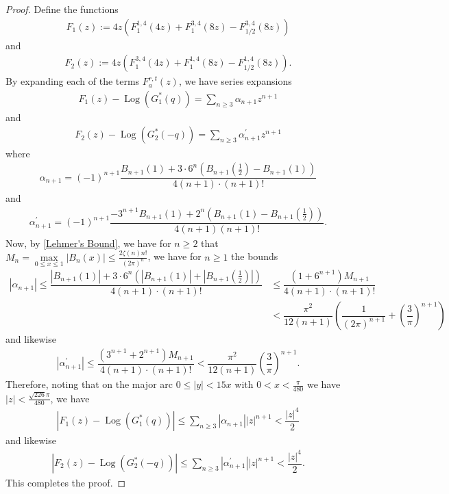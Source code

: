 \documentclass[11pt,reqno]{amsart}
\theoremstyle{definition}
\theoremstyle{plain}
\theoremstyle{named}
\DeclareMathOperator\Log{Log}
\numberwithin{equation}{section}
\theoremstyle{example}
\def\lp{\left(}
\def\rp{\right)}
\begin{document}
\begin{proof}
Define the functions
\begin{align*}
    F_1(z) := 4z \lp F_1^{1,4}(4z) + F_1^{3,4}(8z) - F_{1/2}^{3,4}(8z) \rp
\end{align*}
and
\begin{align*}
    F_2(z) := 4z\lp F_1^{3,4}(4z) + F_1^{1,4}(8z) - F_{1/2}^{1,4}(8z) \rp.
\end{align*}
By expanding each of the terms $F_a^{r,t}(z)$, we have series expansions
\begin{align*}
    F_1(z) - \Log\lp G_1^*(q) \rp = \sum_{n \geq 3} \alpha_{n+1} z^{n+1}
\end{align*}
and
\begin{align*}
    F_2(z) - \Log\lp G_2^*(-q) \rp = \sum_{n \geq 3} \alpha^\prime_{n+1} z^{n+1}
\end{align*}
where
\begin{align*}
    \alpha_{n+1} = (-1)^{n+1} \dfrac{B_{n+1}(1) + 3 \cdot 6^n \lp B_{n+1}\lp \frac 12 \rp - B_{n+1}(1) \rp}{4 (n+1) \cdot (n+1)!}
\end{align*}
and
\begin{align*}
    \alpha_{n+1}^\prime = \lp -1 \rp^{n+1} \dfrac{- 3^{n+1} B_{n+1}(1) + 2^n\lp B_{n+1}(1) - B_{n+1}\lp \frac 12 \rp \rp}{4 (n+1) (n+1)!}.
\end{align*}
Now, by \eqref{Lehmer's Bound}, we have for $n \geq 2$ that $M_n = \max\limits_{0 \leq x \leq 1} \left| B_n(x) \right| \leq \frac{2 \zeta(n) n!}{\lp 2\pi \rp^n}$,  we have for $n \geq 1$ the bounds
\begin{align*}
    \left| \alpha_{n+1} \right| \leq \dfrac{\left| B_{n+1}(1) \right| + 3 \cdot 6^n \lp \left| B_{n+1}(1) \right| + \left| B_{n+1}\lp \frac 12 \rp \right| \rp}{4 (n+1) \cdot (n+1)!} &\leq \dfrac{(1 + 6^{n+1}) M_{n+1}}{4 (n+1) \cdot (n+1)!} \\ &< \dfrac{\pi^2}{12(n+1)} \lp \dfrac{1}{\lp 2\pi \rp^{n+1}} + \lp \dfrac{3}{\pi} \rp^{n+1} \rp
\end{align*}
and likewise
\begin{align*}
    \left| \alpha^\prime_{n+1} \right| \leq \dfrac{\lp 3^{n+1} + 2^{n+1} \rp M_{n+1}}{4 (n+1) \cdot (n+1)!} < \dfrac{\pi^2}{12(n+1)} \lp \dfrac{3}{\pi} \rp^{n+1}.
\end{align*}
Therefore, noting that on the major arc $0 \leq |y| < 15x$ with $0 < x < \frac{\pi}{480}$ we have $|z| < \frac{\sqrt{226} \pi}{480}$, we have
\begin{align*}
    \left| F_1(z) - \Log\lp G_1^*(q) \rp \right| \leq \sum_{n \geq 3} \left| \alpha_{n+1} \right| |z|^{n+1} < \dfrac{|z|^4}{2} 
\end{align*}
and likewise
\begin{align*}
    \left| F_2(z) - \Log\lp G_2^*(-q) \rp \right| \leq \sum_{n \geq 3} \left| \alpha^\prime_{n+1} \right| |z|^{n+1} < \dfrac{|z|^4}{2}.
\end{align*}
This completes the proof.
\end{proof}
\end{document}
